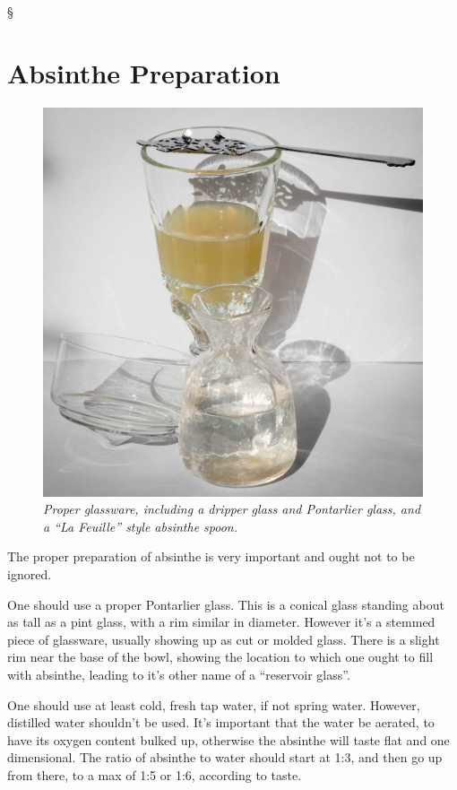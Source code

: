 \documentclass[12pt,letterpaper,oneside]{memoir}
\newcommand\secdiv{
  \begin{center}
    \S
  \end{center}
}
\begin{document}
  \secdiv

  \section*{Absinthe Preparation}

  \begin{figure}
    \vspace{-15pt}
    \includegraphics[width=\linewidth]{../../assets/tasting/naa-glassware.jpg}
    \textit{Proper glassware, including a dripper glass and Pontarlier glass, and a ``La Feuille'' style absinthe spoon.}
    \vspace{-50pt}
  \end{figure}

  The proper preparation of absinthe is very important and ought not to be ignored.

  One should use a proper Pontarlier glass.  This is a conical glass standing about as tall as a pint glass, with a rim similar in diameter.  However it's a stemmed piece of glassware, usually showing up as cut or molded glass.  There is a slight rim near the base of the bowl, showing the location to which one ought to fill with absinthe, leading to it's other name of a ``reservoir glass''.

  One should use at least cold, fresh tap water, if not spring water.  However, distilled water shouldn't be used.  It's important that the water be aerated, to have its oxygen content bulked up, otherwise the absinthe will taste flat and one dimensional.  The ratio of absinthe to water should start at 1:3, and then go up from there, to a max of 1:5 or 1:6, according to taste.
\end{document}
